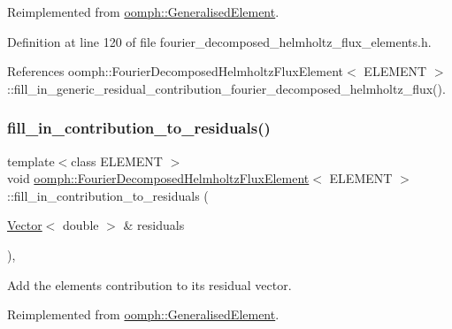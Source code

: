 Reimplemented from \hyperlink{classoomph_1_1GeneralisedElement_a6ae09fc0d68e4309ac1b03583d252845}{oomph\+::\+Generalised\+Element}.



Definition at line 120 of file fourier\+\_\+decomposed\+\_\+helmholtz\+\_\+flux\+\_\+elements.\+h.



References oomph\+::\+Fourier\+Decomposed\+Helmholtz\+Flux\+Element$<$ E\+L\+E\+M\+E\+N\+T $>$\+::fill\+\_\+in\+\_\+generic\+\_\+residual\+\_\+contribution\+\_\+fourier\+\_\+decomposed\+\_\+helmholtz\+\_\+flux().

\mbox{\label{classoomph_1_1FourierDecomposedHelmholtzFluxElement_ab1f6a456d20b3d6105c595dded3a621a}} 
\subsubsection{\texorpdfstring{fill\+\_\+in\+\_\+contribution\+\_\+to\+\_\+residuals()}{fill\_in\_contribution\_to\_residuals()}}
{\footnotesize\ttfamily template$<$class E\+L\+E\+M\+E\+NT $>$ \\
void \hyperlink{classoomph_1_1FourierDecomposedHelmholtzFluxElement}{oomph\+::\+Fourier\+Decomposed\+Helmholtz\+Flux\+Element}$<$ E\+L\+E\+M\+E\+NT $>$\+::fill\+\_\+in\+\_\+contribution\+\_\+to\+\_\+residuals (\begin{DoxyParamCaption}\item[{\hyperlink{classoomph_1_1Vector}{Vector}$<$ double $>$ \&}]{residuals }\end{DoxyParamCaption})\hspace{0.3cm}{\ttfamily [inline]}, {\ttfamily [virtual]}}



Add the element\textquotesingle{}s contribution to its residual vector. 



Reimplemented from \hyperlink{classoomph_1_1GeneralisedElement_a310c97f515e8504a48179c0e72c550d7}{oomph\+::\+Generalised\+Element}.



